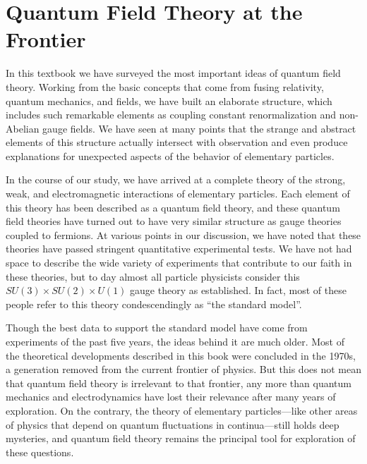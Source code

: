 \chapter{Quantum Field Theory at the Frontier}

In this textbook we have surveyed the most important ideas of quantum field
theory.  Working from the basic concepts that come from fusing relativity,
quantum mechanics, and fields, we have built an elaborate structure, which
includes such remarkable elements as coupling constant renormalization and
non-Abelian gauge fields.  We have seen at many points that the strange and
abstract elements of this structure actually intersect with observation and
even produce explanations for unexpected aspects of the behavior of
elementary particles.

In the course of our study, we have arrived at a complete theory of the
strong, weak, and electromagnetic interactions of elementary particles.  Each
element of this theory has been described as a quantum field theory, and
these quantum field theories have turned out to have very similar structure
as gauge theories coupled to fermions.  At various points in our discussion,
we have noted that these theories have passed stringent quantitative
experimental tests.  We have not had space to describe the wide variety of
experiments that contribute to our faith in these theories, but to day almost
all particle physicists consider this $SU(3)\times SU(2)\times U(1)$ gauge
theory as established.  In fact, most of these people refer to this theory
condescendingly as ``the standard model''.

Though the best data to support the standard model have come from experiments
of the past five years, the ideas behind it are much older.  Most of the
theoretical developments described in this book were concluded in the 1970s,
a generation removed from the current frontier of physics.  But this does not
mean that quantum field theory is irrelevant to that frontier, any more than
quantum mechanics and electrodynamics have lost their relevance after many
years of exploration.  On the contrary, the theory of elementary particles---like
other areas of physics that depend on quantum fluctuations in continua---still
holds deep mysteries, and quantum field theory remains the principal tool for
exploration of these questions.

